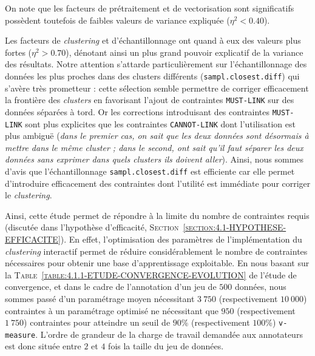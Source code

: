 			\begin{leftBarAuthorOpinion}
				On note que les facteurs de prétraitement et de vectorisation sont significatifs possèdent toutefois de faibles valeurs de variance expliquée ($\eta^{2} < 0.40$).
				
				Les facteurs de \textit{clustering} et d'échantillonnage ont quand à eux des valeurs plus fortes ($\eta^{2} > 0.70$), dénotant ainsi un plus grand pouvoir explicatif de la variance des résultats.
				Notre attention s'attarde particulièrement sur l'échantillonnage des données les plus proches dans des clusters différents (\texttt{sampl.closest.diff}) qui s'avère très prometteur : cette sélection semble permettre de corriger efficacement la frontière des \textit{clusters} en favorisant l'ajout de contraintes \texttt{MUST-LINK} sur des données séparées à tord.
				Or les corrections introduisant des contraintes \texttt{MUST-LINK} sont plus explicites que les contraintes \texttt{CANNOT-LINK} dont l'utilisation est plus ambiguë (\textit{dans le premier cas, on sait que les deux données sont désormais à mettre dans le même \textit{cluster} ; dans le second, ont sait qu'il faut séparer les deux données sans exprimer dans quels \textit{clusters} ils doivent aller}).
				Ainsi, nous sommes d'avis que l'échantillonnage \texttt{sampl.closest.diff} est efficiente car elle permet d'introduire efficacement des contraintes dont l'utilité est immédiate pour corriger le \textit{clustering}.
			\end{leftBarAuthorOpinion}

			Ainsi, cette étude permet de répondre à la limite du nombre de contraintes requis (discutée dans l'hypothèse d'efficacité, \textsc{Section~\ref{section:4.1-HYPOTHESE-EFFICACITE}}).
			En effet, l'optimisation des paramètres de l'implémentation du \textit{clustering} interactif permet de réduire considérablement le nombre de contraintes nécessaires pour obtenir une base d'apprentissage exploitable.
			En nous basant sur la \textsc{Table~\ref{table:4.1.1-ETUDE-CONVERGENCE-EVOLUTION}} de l'étude de convergence, et dans le cadre de l'annotation d'un jeu de $500$ données, nous sommes passé d'un paramétrage moyen nécessitant $3~750$ (respectivement $10~000$) contraintes à un paramétrage optimisé ne nécessitant que $950$ (respectivement $1~750$) contraintes pour atteindre un seuil de $90$\% (respectivement $100$\%) \texttt{v-measure}.
			L'ordre de grandeur de la charge de travail demandée aux annotateurs est donc située entre $2$ et $4$ fois la taille du jeu de données.
			
